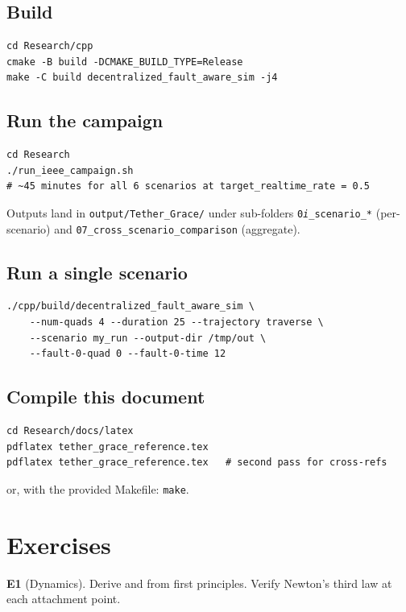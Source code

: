 \documentclass[11pt,a4paper,oneside]{report}
\begin{document}
\section{Build}
\begin{lstlisting}[style=shell]
cd Research/cpp
cmake -B build -DCMAKE_BUILD_TYPE=Release
make -C build decentralized_fault_aware_sim -j4
\end{lstlisting}

\section{Run the campaign}
\begin{lstlisting}[style=shell]
cd Research
./run_ieee_campaign.sh
# ~45 minutes for all 6 scenarios at target_realtime_rate = 0.5
\end{lstlisting}

Outputs land in \texttt{output/Tether\_Grace/} under sub-folders
\texttt{0\emph{i}\_scenario\_*} (per-scenario) and
\texttt{07\_cross\_scenario\_comparison} (aggregate).

\section{Run a single scenario}
\begin{lstlisting}[style=shell]
./cpp/build/decentralized_fault_aware_sim \
    --num-quads 4 --duration 25 --trajectory traverse \
    --scenario my_run --output-dir /tmp/out \
    --fault-0-quad 0 --fault-0-time 12
\end{lstlisting}

\section{Compile this document}
\begin{lstlisting}[style=shell]
cd Research/docs/latex
pdflatex tether_grace_reference.tex
pdflatex tether_grace_reference.tex   # second pass for cross-refs
\end{lstlisting}

or, with the provided Makefile: \texttt{make}.

\chapter{Exercises}
\label{chap:exercises}

\textbf{E1} (Dynamics). Derive  and
 from first principles. Verify
Newton's third law at each attachment point.
\end{document}
